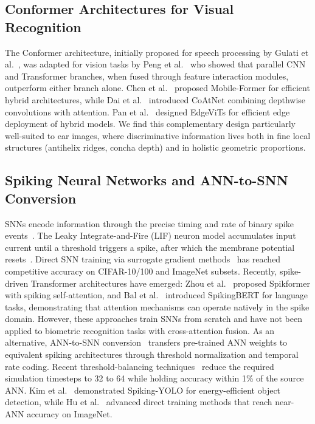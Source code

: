 \documentclass[11pt,a4paper]{article}
\begin{document}
\subsection{Conformer Architectures for Visual Recognition}

The Conformer architecture, initially proposed for speech processing by Gulati et al.~\cite{gulati2020conformer}, was adapted for vision tasks by Peng et al.~\cite{peng2021conformer} who showed that parallel CNN and Transformer branches, when fused through feature interaction modules, outperform either branch alone. Chen et al.~\cite{chen2022mobile} proposed Mobile-Former for efficient hybrid architectures, while Dai et al.~\cite{dai2021coatnet} introduced CoAtNet combining depthwise convolutions with attention. Pan et al.~\cite{pan2022edgevits} designed EdgeViTs for efficient edge deployment of hybrid models. We find this complementary design particularly well-suited to ear images, where discriminative information lives both in fine local structures (antihelix ridges, concha depth) and in holistic geometric proportions.

\subsection{Spiking Neural Networks and ANN-to-SNN Conversion}

SNNs encode information through the precise timing and rate of binary spike events~\cite{maass1997networks, ghosh2009spiking}. The Leaky Integrate-and-Fire (LIF) neuron model accumulates input current until a threshold triggers a spike, after which the membrane potential resets~\cite{tavanaei2019deep}. Direct SNN training via surrogate gradient methods~\cite{neftci2019surrogate, zenke2021remarkable} has reached competitive accuracy on CIFAR-10/100 and ImageNet subsets. Recently, spike-driven Transformer architectures have emerged: Zhou et al.~\cite{zhou2023spikformer} proposed Spikformer with spiking self-attention, and Bal et al.~\cite{bal2024spikingbert} introduced SpikingBERT for language tasks, demonstrating that attention mechanisms can operate natively in the spike domain. However, these approaches train SNNs from scratch and have not been applied to biometric recognition tasks with cross-attention fusion. As an alternative, ANN-to-SNN conversion~\cite{rueckauer2017conversion, sengupta2019going, li2021free} transfers pre-trained ANN weights to equivalent spiking architectures through threshold normalization and temporal rate coding. Recent threshold-balancing techniques~\cite{li2021free, bu2023optimal} reduce the required simulation timesteps to 32 to 64 while holding accuracy within 1\% of the source ANN. Kim et al.~\cite{kim2020spiking} demonstrated Spiking-YOLO for energy-efficient object detection, while Hu et al.~\cite{hu2024advancing} advanced direct training methods that reach near-ANN accuracy on ImageNet.
\end{document}
